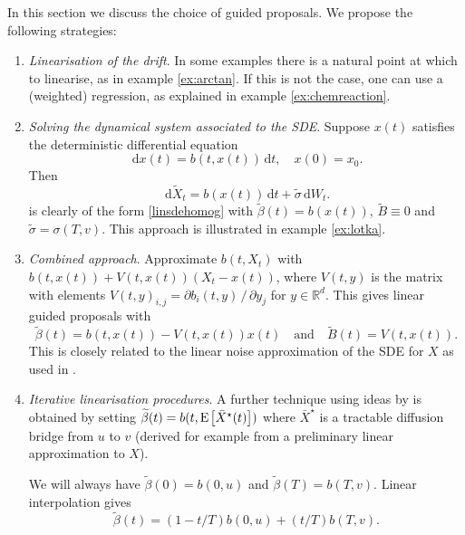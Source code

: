 \documentclass[preprint]{imsart}
\newcommand{\RR}{\mathbb{R}}
\renewcommand{\tilde}{\widetilde}
\theoremstyle{definition}
\newcommand{\dd}{{\,\mathrm d}}
\newcommand{\expec}[1]{\ensuremath{{\rm E}\mspace{-1mu}\left[#1\right]}}
\begin{document}
In this section we discuss the choice of guided proposals. We propose the following strategies:
\begin{enumerate}
\item {\it Linearisation of the drift}. In some examples there is a natural point at which to linearise,  as in example \ref{ex:arctan}. If this is not the case, one can use a (weighted) regression, as explained in example \ref{ex:chemreaction}.  

\item {\it Solving the dynamical system associated to the SDE}. Suppose $x(t)$ satisfies the deterministic differential equation
\begin{equation}\label{nonoise}
\dd x(t) = b(t, x(t))\dd t,\quad x(0) = x_0.
\end{equation}
Then 
\begin{equation}\label{spacetotime}
\dd \tilde X_t = b(x(t)) \dd t + \tilde \sigma \dd W_t.
\end{equation}
 is clearly of the form \eqref{linsdehomog} with $\tilde\beta(t)=b(x(t))$,  $\tilde{B}\equiv 0$ and  $\tilde\sigma = \sigma(T,v)$.  This approach is illustrated in example \ref{ex:lotka}. 

\item {\it Combined approach}. Approximate $b(t,X_t)$ with $b(t,x(t)) +V(t,x(t)) (X_t-x(t))$, where $V(t,y)$ is the matrix with elements $V(t,y)_{i,j}=\partial b_i(t,y)\,/\, \partial y_j$ for $y \in \RR^d$.  This gives linear guided proposals with 
\[ \tilde\beta(t)= b(t,x(t)) - V(t,x(t)) x(t) \quad \text{and} \quad \tilde B(t)=V(t,x(t)). \]
This is closely related to the linear noise approximation of the SDE for $X$ as used in \cite{Whitaker}. 

\item {\it Iterative linearisation procedures}.
A further technique using ideas by \cite{Whitaker} is obtained by setting $\tilde\beta(t)=b(t, \expec{ \bar X^\star(t)})$ 
where $\bar X^\star$ is a tractable diffusion bridge from $u$ to $v$ (derived for example from a preliminary linear approximation to $X$). 

We will always have $\tilde\beta(0) = b(0,u)$ and $\tilde\beta(T) = b(T,v)$. Linear interpolation gives
\begin{equation}\label{eq:propbeta-simple}
\tilde\beta(t) =  (1-t/T) b(0,u) +  (t/T) b(T,v).
\end{equation}

\end{enumerate}
\end{document}
